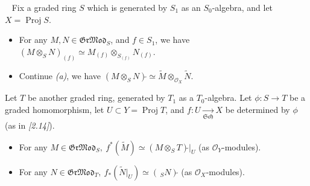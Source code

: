 \documentclass[11pt,a4paper,footinclude=true,headinclude=true]{scrbook} %
\DeclareMathOperator{\Proj}{Proj}
\newcommand{\OO}{\mathcal{O}}
\newcommand{\Sch}{\mathfrak{Sch}}
\newcommand{\<}{\langle}
\newcommand{\>}{\rangle}
\newcommand{\GR}{\mathfrak{Gr}}
\newcommand{\MOD}{\mathfrak{Mod}}
\newenvironment{proposition}[2][]
{\renewcommand\theinnercustomprop{#2}\innercustomprop[#1] 
\begin{mdframed}[backgroundcolor=gray!20]\ }
{\end{mdframed}\endinnercustomprop}
\begin{document}
\begin{proposition}{5.A}
    Fix a graded ring $S$ which is generated by $S_1$ as an $S_0$-algebra, and let $X=\Proj S$.
    \begin{itemize}
        \item[(a)] For any $M,N\in \GR\MOD_S$, and $f\in S_1$, we have $(M\otimes_SN)_{(f)}\simeq M_{(f)}\otimes_{S_{(f)}}N_{(f)}$.
        \item[(b)] Continue \textit{(a)}, we have $(M\otimes_SN)\widetilde{}\simeq\widetilde{M}\otimes_{\OO_X}\widetilde{N}$.
    \end{itemize}
    Let $T$ be another graded ring, generated by $T_1$ as a $T_0$-algebra. Let $\phi:S\to T$ be a graded homomorphism, let $U\subset Y=\Proj T$, and $f:U\xrightarrow[\Sch]{} X$ be determined by $\phi$ (as in \textit{[2.14]}).
    \begin{itemize}
        \item[(c)] For any $M\in \GR\MOD_S,\ f^\ast(\widetilde{M})\simeq(M\otimes_ST)\widetilde{}|_U$ (as $\OO_Y$-modules).
        \item[(d)] For any $N\in \GR\MOD_T,\ f_\ast(\widetilde{N}|_U)\simeq(\,_SN)\widetilde{}$ (as $\OO_X$-modules).
    \end{itemize}
\end{proposition}
\end{document}
